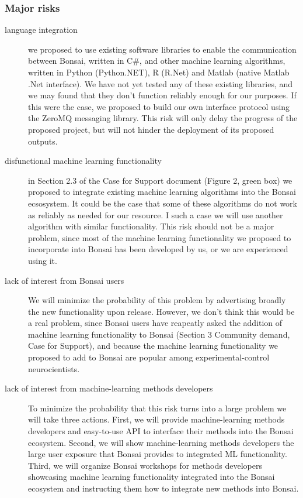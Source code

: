 \documentclass[a4paper,11pt]{article}
\begin{document}
\subsubsection*{Major risks}

\begin{description}

    \item[language integration] we proposed to use existing software libraries
        to enable the communication between Bonsai, written in C\#, and other
        machine learning algorithms, written in Python (Python.NET), R (R.Net)
        and Matlab (native Matlab .Net interface). We have not yet tested any
        of these existing libraries, and we may found that they don't function
        reliably enough for our purposes. If this were the case, we proposed to
        build our own interface protocol using the ZeroMQ messaging library.
        This risk will only delay the progress of the proposed project, but
        will not hinder the deployment of its proposed outputs.

    \item[disfunctional machine learning functionality] in Section 2.3 of the
        Case for Support document (Figure 2, green box) we proposed to
        integrate existing machine learning algorithms into the Bonsai
        ecsosystem. It could be the case that some of these algorithms do not
        work as reliably as needed for our resource. I such a case we will use
        another algorithm with similar functionality.  This risk should not be
        a major problem, since most of the machine learning functionality we
        proposed to incorporate into Bonsai has been developed by us, or we are
        experienced using it.

    \item[lack of interest from Bonsai users] We will minimize the probability
        of this problem by advertising broadly the new functionality upon
        release.  However, we don't think this would be a real problem, since
        Bonsai users have reapeatly asked the addition of machine learning
        functionality to Bonsai (Section 3 Community demand, Case for Support),
        and because the machine learning functionality we proposed to add to
        Bonsai are popular among experimental-control neurocientists.

    \item[lack of interest from machine-learning methods developers] To
        minimize the probability that this risk turns into a large problem we
        will take three actions. First, we will provide machine-learning
        methods developers and easy-to-use API to interface their methods into
        the Bonsai ecosystem. Second, we will show machine-learning methods
        developers the large user exposure that Bonsai provides to integrated
        ML functionality. Third, we will organize Bonsai workshops for methods
        developers showcasing machine learning functionality integrated into
        the Bonsai ecosystem and instructing them how to integrate new methods
        into Bonsai.

    \end{description}
\end{document}

